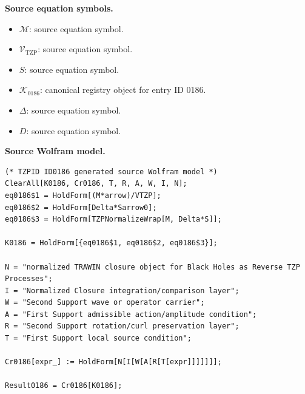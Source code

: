 \begin{minipage}[t]{0.49\linewidth}
\begingroup
\small
\raggedright
\textbf{Source equation symbols.}\par
\begin{itemize}[leftmargin=1.35em,itemsep=1pt,topsep=1pt,parsep=0pt]
    \item $\mathcal{M}$: source equation symbol.
    \item $\mathcal{V}_{\mathrm{TZP}}$: source equation symbol.
    \item $S$: source equation symbol.
    \item $\mathcal{K}_{0186}$: canonical registry object for entry ID 0186.
    \item $\Delta$: source equation symbol.
    \item $D$: source equation symbol.
\end{itemize}
\endgroup
\end{minipage}\hfill
\begin{minipage}[t]{0.47\linewidth}
\begingroup
\scriptsize
\raggedright
\textbf{Source Wolfram model.}\par
\begin{Verbatim}[fontsize=\tiny,breaklines=true,breakanywhere=true]
(* TZPID ID0186 generated source Wolfram model *)
ClearAll[K0186, Cr0186, T, R, A, W, I, N];
eq0186$1 = HoldForm[(M*arrow)/VTZP];
eq0186$2 = HoldForm[Delta*Sarrow0];
eq0186$3 = HoldForm[TZPNormalizeWrap[M, Delta*S]];

K0186 = HoldForm[{eq0186$1, eq0186$2, eq0186$3}];

N = "normalized TRAWIN closure object for Black Holes as Reverse TZP Processes";
I = "Normalized Closure integration/comparison layer";
W = "Second Support wave or operator carrier";
A = "First Support admissible action/amplitude condition";
R = "Second Support rotation/curl preservation layer";
T = "First Support local source condition";

Cr0186[expr_] := HoldForm[N[I[W[A[R[T[expr]]]]]]];

Result0186 = Cr0186[K0186];
\end{Verbatim}
\endgroup
\end{minipage}

